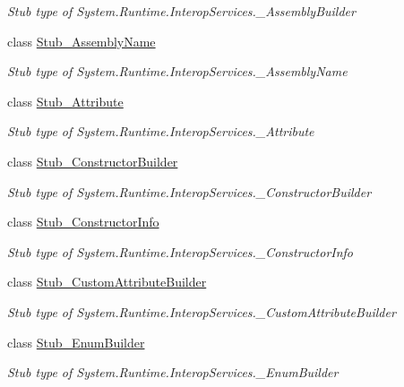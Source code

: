 \begin{DoxyCompactItemize}
\begin{DoxyCompactList}\small\item\em Stub type of System.\-Runtime.\-Interop\-Services.\-\_\-\-Assembly\-Builder\end{DoxyCompactList}\item 
class \hyperlink{class_system_1_1_runtime_1_1_interop_services_1_1_fakes_1_1_stub___assembly_name}{Stub\-\_\-\-Assembly\-Name}
\begin{DoxyCompactList}\small\item\em Stub type of System.\-Runtime.\-Interop\-Services.\-\_\-\-Assembly\-Name\end{DoxyCompactList}\item 
class \hyperlink{class_system_1_1_runtime_1_1_interop_services_1_1_fakes_1_1_stub___attribute}{Stub\-\_\-\-Attribute}
\begin{DoxyCompactList}\small\item\em Stub type of System.\-Runtime.\-Interop\-Services.\-\_\-\-Attribute\end{DoxyCompactList}\item 
class \hyperlink{class_system_1_1_runtime_1_1_interop_services_1_1_fakes_1_1_stub___constructor_builder}{Stub\-\_\-\-Constructor\-Builder}
\begin{DoxyCompactList}\small\item\em Stub type of System.\-Runtime.\-Interop\-Services.\-\_\-\-Constructor\-Builder\end{DoxyCompactList}\item 
class \hyperlink{class_system_1_1_runtime_1_1_interop_services_1_1_fakes_1_1_stub___constructor_info}{Stub\-\_\-\-Constructor\-Info}
\begin{DoxyCompactList}\small\item\em Stub type of System.\-Runtime.\-Interop\-Services.\-\_\-\-Constructor\-Info\end{DoxyCompactList}\item 
class \hyperlink{class_system_1_1_runtime_1_1_interop_services_1_1_fakes_1_1_stub___custom_attribute_builder}{Stub\-\_\-\-Custom\-Attribute\-Builder}
\begin{DoxyCompactList}\small\item\em Stub type of System.\-Runtime.\-Interop\-Services.\-\_\-\-Custom\-Attribute\-Builder\end{DoxyCompactList}\item 
class \hyperlink{class_system_1_1_runtime_1_1_interop_services_1_1_fakes_1_1_stub___enum_builder}{Stub\-\_\-\-Enum\-Builder}
\begin{DoxyCompactList}\small\item\em Stub type of System.\-Runtime.\-Interop\-Services.\-\_\-\-Enum\-Builder\end{DoxyCompactList}\item 

\end{DoxyCompactItemize}

